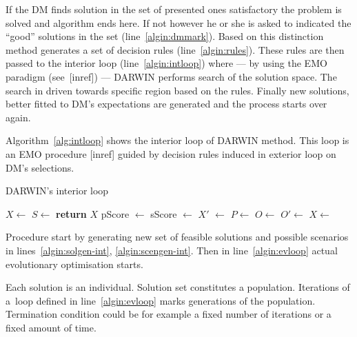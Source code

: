 If the DM finds solution in the set of presented ones satisfactory the problem
is solved and algorithm ends here. If not however he or she is asked to
indicated the ``good'' solutions in the set (line~\ref{algin:dmmark}).  Based
on this distinction method generates a set of decision rules
(line~\ref{algin:rules}). These rules are then passed to the interior loop
(line~\ref{algin:intloop}) where --- by using the EMO paradigm (see~[inref])
--- DARWIN performs search of the solution space. The search in driven towards
specific region based on the rules. Finally new solutions, better fitted to
DM's expectations are generated and the process starts over again.

Algorithm~\ref{alg:intloop} shows the interior loop of DARWIN method. This
loop is an EMO procedure [inref] guided by decision rules induced in exterior
loop on DM's selections.

\begin{algorithm}
\caption{DARWIN's interior loop}\label{alg:intloop}
  \begin{algorithmic}[1]
    \State $X \gets$  \label{algin:solgen-int}
    \State $S \gets$  \label{algin:scengen-int}
    \Loop \label{algin:evloop}
     \label{algin:evstart-int} 
    \State {}
    \EndFor{} \label{algin:evstop-int}
    \State \textbf{return} $X$
    \EndIf
    \State pScore $\gets$  \label{algin:ps}
    \State sScore $\gets$  \label{algin:ss}
    \State $X'$ $\gets$  \label{algin:rank}
    \State $P \gets$  \label{algin:select}
    \State $O \gets$  \label{algin:off}
    \State $O' \gets$  \label{algin:mut}
    \State $X \gets$  \label{algin:merge}
    \EndLoop
    \EndProcedure{}
  \end{algorithmic}
\end{algorithm}

Procedure start by generating new set of feasible solutions and possible
scenarios in lines~\ref{algin:solgen-int}, \ref{algin:scengen-int}. Then in
line~\ref{algin:evloop} actual evolutionary optimisation starts.

Each solution is an individual. Solution set constitutes a
population. Iterations of a~loop defined in line~\ref{algin:evloop} marks 
generations of the population. Termination condition could be for example
a fixed number of iterations or a fixed amount of time.

